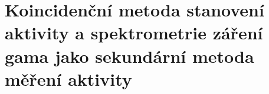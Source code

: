 \section[Koincidenční metoda \& spektrometrie gama]{Koincidenční metoda stanovení aktivity a spektrometrie záření gama jako sekundární metoda měření aktivity}

